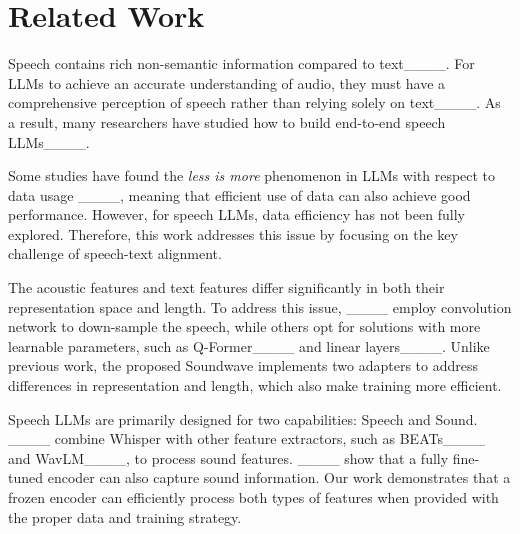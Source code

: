 \section{Related Work}
Speech contains rich non-semantic information compared to text____. For LLMs to achieve an accurate understanding of audio, they must have a comprehensive perception of speech rather than relying solely on text____. As a result, many researchers have studied how to build end-to-end speech LLMs____. 

Some studies have found the \textit{less is more} phenomenon in LLMs with respect to data usage ____, meaning that efficient use of data can also achieve good performance. However, for speech LLMs, data efficiency has not been fully explored. Therefore, this work addresses this issue by focusing on the key challenge of speech-text alignment.

The acoustic features and text features differ significantly in both their representation space and length. To address this issue, ____ employ convolution network to down-sample the speech, while others opt for solutions with more learnable parameters, such as Q-Former____ and linear layers____. Unlike previous work, the proposed Soundwave implements two adapters to address differences in representation and length, which also make training more efficient.


Speech LLMs are primarily designed for two capabilities: Speech and Sound. ____ combine Whisper with other feature extractors, such as BEATs____ and WavLM____, to process sound features. 
____ show that a fully fine-tuned encoder can also capture sound information. Our work demonstrates that a frozen encoder can efficiently process both types of features when provided with the proper data and training strategy.